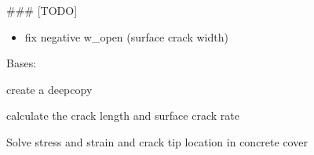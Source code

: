 \documentclass[letterpaper,10pt,english]{sphinxmanual}
\begin{document}
\sphinxAtStartPar
\#\#\# {[}TODO{]}
\begin{itemize}
\item {} 
\sphinxAtStartPar
fix negative w\_open (surface crack width)

\end{itemize}

\begin{fulllineitems}
\label{\detokenize{cracking:cracking.Cracking_Model}}
\sphinxAtStartPar
Bases: 

\begin{fulllineitems}
\label{\detokenize{cracking:cracking.Cracking_Model.copy}}
\sphinxAtStartPar
create a deepcopy

\end{fulllineitems}


\begin{fulllineitems}
\label{\detokenize{cracking:cracking.Cracking_Model.postproc}}
\sphinxAtStartPar
calculate the crack length and surface crack rate

\end{fulllineitems}


\begin{fulllineitems}
\label{\detokenize{cracking:cracking.Cracking_Model.run}}
\sphinxAtStartPar
Solve stress and strain and crack tip location in concrete cover

\end{fulllineitems}


\end{fulllineitems}
\end{document}
